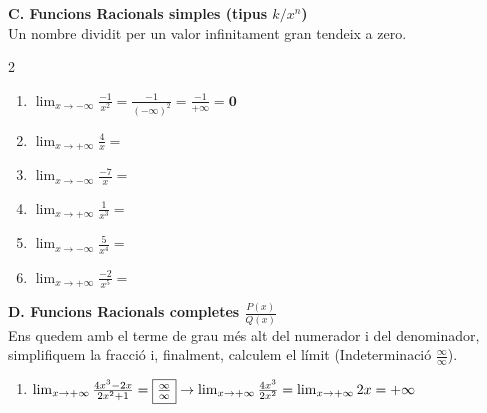 \documentclass[12pt,a4paper]{article}
\begin{document}
\vspace{0.5cm}

\textbf{C. Funcions Racionals simples (tipus $k/x^n$)} \\
Un nombre dividit per un valor infinitament gran tendeix a zero.
\vspace{-0.2cm}
\begin{multicols}{2}
\begin{enumerate}[label=\textbf{\arabic*.}, resume, itemsep=0.8cm]
    \item $\lim_{x \to -\infty} \frac{-1}{x^2} = \frac{-1}{(-\infty)^2} = \frac{-1}{+\infty} = \mathbf{0}$
    \item $\lim_{x \to +\infty} \frac{4}{x} =$
    \item $\lim_{x \to -\infty} \frac{-7}{x} =$
    \item $\lim_{x \to +\infty} \frac{1}{x^3} =$
    \item $\lim_{x \to -\infty} \frac{5}{x^4} =$
    \item $\lim_{x \to +\infty} \frac{-2}{x^5} =$
\end{enumerate}
\end{multicols}

\vspace{0.5cm}
\newpage

\textbf{D. Funcions Racionals completes $\frac{P(x)}{Q(x)}$} \\
Ens quedem amb el terme de grau més alt del numerador i del denominador, simplifiquem la fracció i, finalment, calculem el límit (Indeterminació $\frac{\infty}{\infty}$).
\vspace{-0.2cm}
\begin{enumerate}[label=\textbf{\arabic*.}, resume, itemsep=0.8cm]
    \item $\lim_{x \to +\infty} \frac{4x^3 - 2x}{2x^2 + 1} = \fbox{$\frac{\infty}{\infty}$} \rightarrow \lim_{x \to +\infty} \frac{4x^3}{2x^2} = \lim_{x \to +\infty} 2x = \mathbf{+\infty}$
\end{enumerate}
\end{document}
